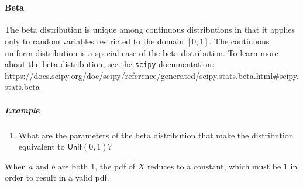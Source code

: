 \documentclass[11pt]{article}
\providecommand{\tightlist}{%
      \setlength{\itemsep}{0pt}\setlength{\parskip}{0pt}}
\begin{document}
    \begin{center}
    \end{center}
    { \hspace*{\fill} \\}
    
    \paragraph{Beta}\label{beta}

The beta distribution is unique among continuous distributions in that
it applies only to random variables restricted to the domain \([0,1]\).
The continuous uniform distribution is a special case of the beta
distribution. To learn more about the beta distribution, see the
\texttt{scipy} documentation:
https://docs.scipy.org/doc/scipy/reference/generated/scipy.stats.beta.html\#scipy.stats.beta

    \subparagraph{Example}\label{example}

\begin{enumerate}
\def\labelenumi{\arabic{enumi})}
\tightlist
\item
  What are the parameters of the beta distribution that make the
  distribution equivalent to \(\textsf{Unif}(0,1)\)?
\end{enumerate}

    When \(a\) and \(b\) are both 1, the pdf of \(X\) reduces to a constant,
which must be 1 in order to result in a valid pdf.


    
    
    
    
\end{document}
